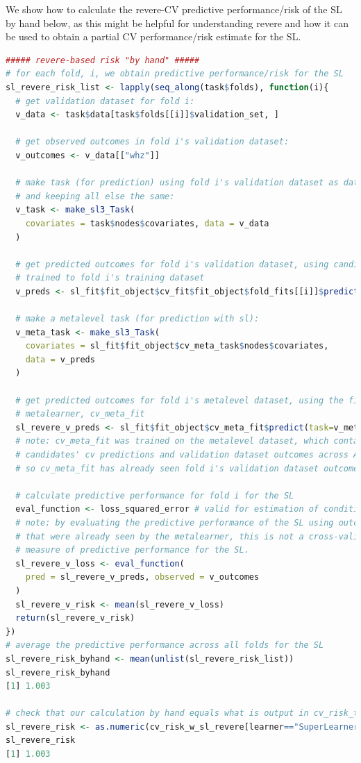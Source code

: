 \documentclass[
  12pt, krantz2,
]{krantz}
\newcommand{\1}{\mathbbm{1}}
\theoremstyle{definition}
\theoremstyle{definition}
\theoremstyle{definition}
\theoremstyle{definition}
\theoremstyle{remark}
\begin{document}
We show how to calculate the revere-CV predictive performance/risk of the SL by
hand below, as this might be helpful for understanding revere and how it can be
used to obtain a partial CV performance/risk estimate for the SL.

\begin{lstlisting}[language=R]
##### revere-based risk "by hand" #####
# for each fold, i, we obtain predictive performance/risk for the SL
sl_revere_risk_list <- lapply(seq_along(task$folds), function(i){
  # get validation dataset for fold i:
  v_data <- task$data[task$folds[[i]]$validation_set, ]

  # get observed outcomes in fold i's validation dataset:
  v_outcomes <- v_data[["whz"]]

  # make task (for prediction) using fold i's validation dataset as data,
  # and keeping all else the same:
  v_task <- make_sl3_Task(
    covariates = task$nodes$covariates, data = v_data
  )

  # get predicted outcomes for fold i's validation dataset, using candidates
  # trained to fold i's training dataset
  v_preds <- sl_fit$fit_object$cv_fit$fit_object$fold_fits[[i]]$predict(v_task)

  # make a metalevel task (for prediction with sl):
  v_meta_task <- make_sl3_Task(
    covariates = sl_fit$fit_object$cv_meta_task$nodes$covariates,
    data = v_preds
  )

  # get predicted outcomes for fold i's metalevel dataset, using the fitted
  # metalearner, cv_meta_fit
  sl_revere_v_preds <- sl_fit$fit_object$cv_meta_fit$predict(task=v_meta_task)
  # note: cv_meta_fit was trained on the metalevel dataset, which contains the
  # candidates' cv predictions and validation dataset outcomes across ALL folds,
  # so cv_meta_fit has already seen fold i's validation dataset outcomes.

  # calculate predictive performance for fold i for the SL
  eval_function <- loss_squared_error # valid for estimation of conditional mean
  # note: by evaluating the predictive performance of the SL using outcomes
  # that were already seen by the metalearner, this is not a cross-validated
  # measure of predictive performance for the SL.
  sl_revere_v_loss <- eval_function(
    pred = sl_revere_v_preds, observed = v_outcomes
  )
  sl_revere_v_risk <- mean(sl_revere_v_loss)
  return(sl_revere_v_risk)
})
# average the predictive performance across all folds for the SL
sl_revere_risk_byhand <- mean(unlist(sl_revere_risk_list))
sl_revere_risk_byhand
[1] 1.003

# check that our calculation by hand equals what is output in cv_risk_table_revere
sl_revere_risk <- as.numeric(cv_risk_w_sl_revere[learner=="SuperLearner","MSE"])
sl_revere_risk
[1] 1.003
\end{lstlisting}
\end{document}
